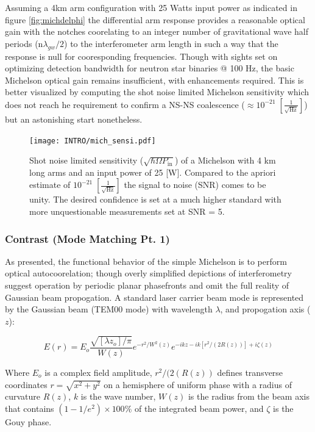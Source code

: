 Assuming a 4km arm configuration with 25 Watts input power as indicated in figure \autoref{fig:michdelphi} the differential arm response provides a reasonable optical gain with the notches coorelating to an integer number of gravitational wave half periods ($\mathrm{n}\lambda_{gw} / 2$) to the interferometer arm length in such a way that the response is null for cooresponding frequencies. Though with sights set on optimizing detection bandwidth for neutron star binaries @ 100 Hz, the basic Michelson optical gain remains insufficient, with enhancements required. This is better visualized by computing the shot noise limited Michelson sensitivity which does not reach he requirement to confirm a NS-NS coalescence ($\approx 10^{-21} \; [\frac{1}{\sqrt{\mathrm{Hz}}}]$) but an astonishing start nonetheless.


\begin{figure}[H]
	\centering
	\texttt{[image: INTRO/mich\_sensi.pdf]}
	\caption{Shot noise limited sensitivity ($\sqrt{\hbar \Omega P_\mathrm{in}}$) of a Michelson with 4 km long arms and an input power of 25 [W]. Compared to the apriori estimate of $10^{-21} \; [\frac{1}{\sqrt{\mathrm{Hz}}}]$ the signal to noise (SNR) comes to be unity. The desired confidence is set at a much higher standard with more unquestionable measurements set at SNR = 5.}
	\label{fig:michsensitivity}
\end{figure}

\subsubsection{Contrast (Mode Matching Pt. 1)}
As presented, the functional behavior of the simple Michelson is to perform optical autocoorelation; though overly simplified depictions of interferometry suggest operation by periodic planar phasefronts and omit the full reality of Gaussian beam propogation. A standard laser carrier beam mode is represented by the Gaussian beam (TEM00 mode) with wavelength $\lambda$, and propogation axis ($z$):

\begin{equation}\label{eq:gaussianbeam}
E(r) = E_o \frac{\sqrt{[\lambda z_o] / \pi}}{W(z)}e^{-r^2 / W^2(z)} e^{-ikz - ik[r^2 / (2R(z))] + i \zeta(z)}
\end{equation}

Where $E_o$ is a complex field amplitude, $r^{2}/(2(R(z))$ defines transverse coordinates $r = \sqrt{x^{2} + y^{2}}$ on a hemisphere of uniform phase with a radius of curvature $R(z)$, $k$ is the wave number, $W(z)$ is the radius from the beam axis that contains $(1-1/e^2) \times 100 \%$ of the integrated beam power, and $\zeta$ is the Gouy phase. 

